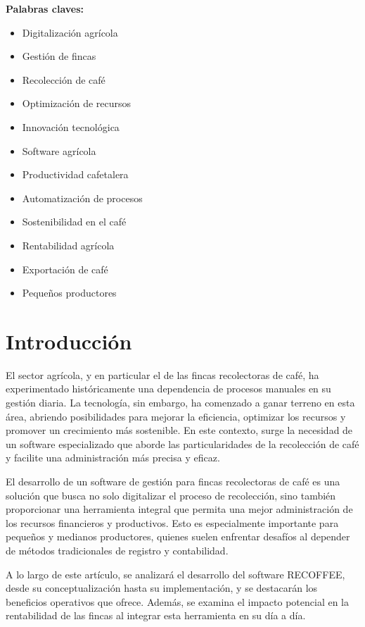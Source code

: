 \documentclass[12pt]{article}
\begin{document}
\textbf{Palabras claves:}
\begin{itemize}
    \item Digitalizaci\'on agr\'icola
    \item Gesti\'on de fincas
    \item Recolecci\'on de caf\'e
    \item Optimizaci\'on de recursos
    \item Innovaci\'on tecnol\'ogica
    \item Software agr\'icola
    \item Productividad cafetalera
    \item Automatizaci\'on de procesos
    \item Sostenibilidad en el caf\'e
    \item Rentabilidad agr\'icola
    \item Exportaci\'on de caf\'e
    \item Peque\~nos productores
\end{itemize}


\section{Introducci\'on}
El sector agr\'icola, y en particular el de las fincas recolectoras de caf\'e, ha experimentado hist\'oricamente una dependencia de procesos manuales en su gesti\'on diaria. La tecnolog\'ia, sin embargo, ha comenzado a ganar terreno en esta \'area, abriendo posibilidades para mejorar la eficiencia, optimizar los recursos y promover un crecimiento m\'as sostenible. En este contexto, surge la necesidad de un software especializado que aborde las particularidades de la recolecci\'on de caf\'e y facilite una administraci\'on m\'as precisa y eficaz.

El desarrollo de un software de gesti\'on para fincas recolectoras de caf\'e es una soluci\'on que busca no solo digitalizar el proceso de recolecci\'on, sino tambi\'en proporcionar una herramienta integral que permita una mejor administraci\'on de los recursos financieros y productivos. Esto es especialmente importante para peque\~nos y medianos productores, quienes suelen enfrentar desaf\'ios al depender de m\'etodos tradicionales de registro y contabilidad.

A lo largo de este art\'iculo, se analizar\'a el desarrollo del software RECOFFEE, desde su conceptualizaci\'on hasta su implementaci\'on, y se destacar\'an los beneficios operativos que ofrece. Adem\'as, se examina el impacto potencial en la rentabilidad de las fincas al integrar esta herramienta en su d\'ia a d\'ia.
\end{document}
